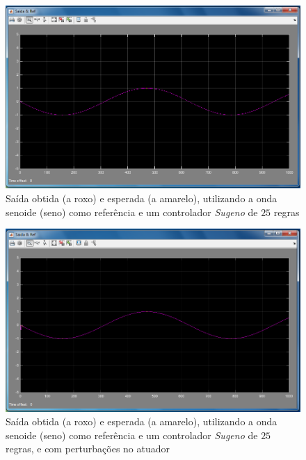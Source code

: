 \documentclass{article}
\begin{document}
\begin{figure}[h]
  \centering
      \includegraphics[scale=0.3]{Images/Sugeno_25_sin.png}
  \caption{Saída obtida (a roxo) e esperada (a amarelo), utilizando a onda senoide (seno) como referência e um controlador \emph{Sugeno} de $25$ regras}
\end{figure}

\begin{figure}[h]
  \centering
      \includegraphics[scale=0.3]{Images/Sugeno_25_sin_actuator.png}
  \caption{Saída obtida (a roxo) e esperada (a amarelo), utilizando a onda senoide (seno) como referência e um controlador \emph{Sugeno} de $25$ regras, e com perturbações no atuador}
\end{figure}
\end{document}
